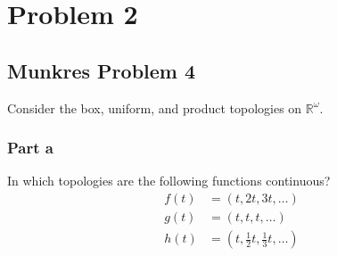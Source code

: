 \documentclass[fontsize=11pt]{scrartcl} %
\numberwithin{equation}{section} %
\numberwithin{figure}{section} %
\numberwithin{table}{section} %
\newcommand{\R}{\mathbb{R}}
\begin{document}
\pagebreak
\section*{Problem 2}
\subsection*{Munkres Problem 4}
Consider the box, uniform, and product topologies on $\R^{\omega}$.
\subsubsection*{Part a}
In which topologies are the following functions continuous?
\[
    \begin{aligned}
        f(t) &= (t,2t,3t,\ldots)\\
        g(t) &= (t,t,t,\ldots)\\
        h(t) &= (t,\frac{1}{2}t,\frac{1}{3}t,\ldots)
    \end{aligned}
\]
\end{document}
